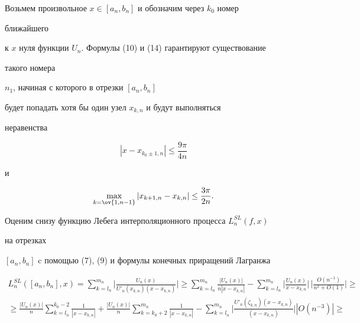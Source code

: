  


\begin{pf} 


Возьмем произвольное $x\in[a_n,b_n]$ и обозначим через $k_0$ номер 


ближайшего 


к $x$ нуля функции $U_n$. Формулы (10) и (14) гарантируют существование 


такого номера 


$n_1$, начиная с которого в отрезки $[a_n,b_n]$ 


будет попадать хотя бы один узел $x_{k,n}$ и будут выполняться 


неравенства 


\begin{equation} 


|x-x_{k_0\pm1,n}|\le\frac{9\pi}{4n} 


\end{equation} 


и 


$$ 


\max_{k=\ov{1,n-1}}|x_{k+1,n}-x_{k,n}|\le\frac{3\pi}{2n}. 


$$ 


Оценим снизу функцию Лебега интерполяционного процесса $L^{SL}_n(f,x)$ 


на отрезках 


$[a_n,b_n]$ c помощью (7), (9) и формулы конечных приращений Лагранжа 


\begin{multline} 


L^{SL}_n([a_n,b_n],x)=\sum^{m_n}_{k=l_n}\bigg| 


\frac{U_n(x)}{U'_n(x_{k,n})(x-x_{k,n})}\bigg|\ge 


\sum^{m_n}_{k=l_n}\frac{|U_n(x)|}{n|x-x_{k,n}|}- 


\sum^{m_n}_{k=l_n}\bigg|\frac{U_n(x)}{x-x_{k,n}}\bigg|\, 


\bigg|\frac{O(n^{-1})}{n^2+O(1)}\bigg|\ge \\ 


% 


\ge\frac{|U_n(x)|}{n}\sum^{k_0-2}_{k=l_n} 


\frac{1}{|x-x_{k,n}|}+\frac{|U_n(x)|}{n} 


\sum^{m_n}_{k=k_0+2}\frac{1}{|x-x_{k,n}|}- 


\sum^{m_n}_{k=l_n}\bigg| 


\frac{U'_n(\zeta_{k,n})(x-x_{k,n})}{(x-x_{k,n})}\bigg| 


|O(n^{-3})|\ge \\ 



\end{multline}
\end{pf}
